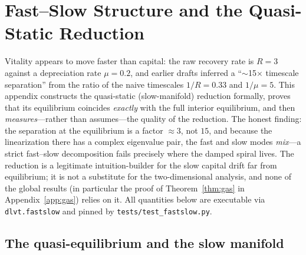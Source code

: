 \section{Fast--Slow Structure and the Quasi-Static Reduction}
\label{app:fastslow}

Vitality appears to move faster than capital: the raw recovery rate is
$R=3$ against a depreciation rate $\mu=0.2$, and earlier drafts inferred a
``$\sim$15$\times$ timescale separation'' from the ratio of the naive
timescales $1/R=0.33$ and $1/\mu=5$. This appendix constructs the
quasi-static (slow-manifold) reduction formally, proves that its
equilibrium coincides \emph{exactly} with the full interior equilibrium,
and then \emph{measures}---rather than assumes---the quality of the
reduction. The honest finding: the separation at the equilibrium is a
factor $\approx3$, not $15$, and because the linearization there has a
complex eigenvalue pair, the fast and slow modes \emph{mix}---a strict
fast--slow decomposition fails precisely where the damped spiral lives.
The reduction is a legitimate intuition-builder for the slow capital
drift far from equilibrium; it is not a substitute for the
two-dimensional analysis, and none of the global results (in particular
the proof of Theorem~\ref{thm:gas} in Appendix~\ref{app:gas}) relies on
it. All quantities below are executable via \texttt{dlvt.fastslow} and
pinned by \texttt{tests/test\_fastslow.py}.

\subsection{The quasi-equilibrium and the slow manifold}

